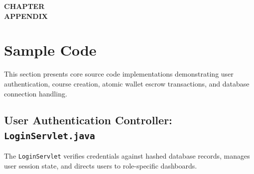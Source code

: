 \documentclass[12pt,a4paper]{report}
\newcommand{\chaptertitlepage}[1]{%
  \clearpage
  \thispagestyle{empty}
  \null
  \vfill
  \begin{center}
    {\fontsize{16pt}{18pt}\selectfont\bfseries CHAPTER \thechapter}\\[0.5cm]
    {\fontsize{16pt}{18pt}\selectfont\bfseries #1}
  \end{center}
  \vfill
  \null
  \clearpage
  \setcounter{section}{0}
}
\begin{document}
\chaptertitlepage{APPENDIX}

\section{Sample Code}
This section presents core source code implementations demonstrating user authentication, course creation, atomic wallet escrow transactions, and database connection handling.

\subsection{User Authentication Controller: \texttt{LoginServlet.java}}
The \texttt{LoginServlet} verifies credentials against hashed database records, manages user session state, and directs users to role-specific dashboards.
\end{document}
